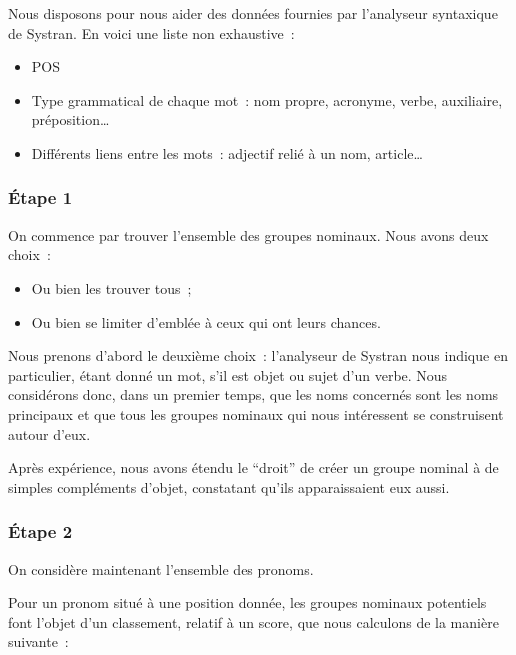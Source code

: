 \documentclass[a4paper, 12pt]{article}
\begin{document}
Nous disposons pour nous aider des données fournies par l'analyseur syntaxique de Systran. En voici une liste non exhaustive~:
\begin{itemize}
 \item POS
 \item Type grammatical de chaque mot~: nom propre, acronyme, verbe, auxiliaire, préposition\ldots{}
 \item Différents liens entre les mots~: adjectif relié à un nom, article\ldots{}
\end{itemize}


\subsubsection{Étape 1}
On commence par trouver l'ensemble des groupes nominaux. Nous avons deux choix~:
\begin{itemize}
 \item Ou bien les trouver tous~;
 \item Ou bien se limiter d'emblée à ceux qui ont leurs chances.
\end{itemize}

Nous prenons d'abord le deuxième choix~: l'analyseur de Systran nous indique en particulier, étant donné un mot, s'il est objet ou sujet d'un verbe. Nous considérons donc, dans un premier temps, que les noms concernés sont les noms principaux et que tous les groupes nominaux qui nous intéressent se construisent autour d'eux.

Après expérience, nous avons étendu le ``droit'' de créer un groupe nominal à de simples compléments d'objet, constatant qu'ils apparaissaient eux aussi.


\subsubsection{Étape 2}
On considère maintenant l'ensemble des pronoms.

Pour un pronom situé à une position donnée, les groupes nominaux potentiels font l'objet d'un classement, relatif à un score, que nous calculons de la manière suivante~:
\end{document}

